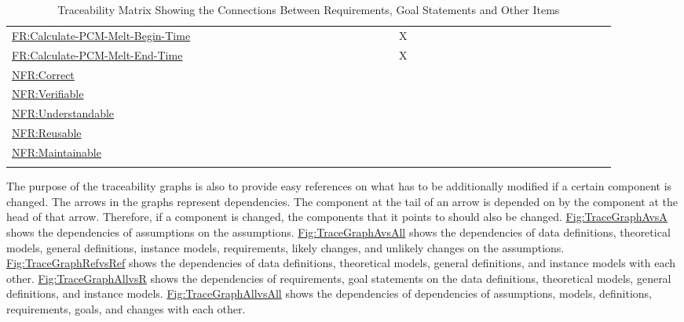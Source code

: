 \documentclass[12pt]{article}
\begin{document}
\begin{longtable}{l l l l l l l l l l l l l l l l l l l l l l l l l l l l l l l l l l l l l l}
\\
\hyperref[calcPCMMeltBegin]{FR:Calculate-PCM-Melt-Begin-Time} &  &  &  &  &  &  &  &  &  &  &  &  &  &  &  &  &  &  & X &  &  &  &  &  &  &  &  &  &  &  &  &  &  &  &  &  & 
\\
\hyperref[calcPCMMeltEnd]{FR:Calculate-PCM-Melt-End-Time} &  &  &  &  &  &  &  &  &  &  &  &  &  &  &  &  &  &  & X &  &  &  &  &  &  &  &  &  &  &  &  &  &  &  &  &  & 
\\
\hyperref[correct]{NFR:Correct} &  &  &  &  &  &  &  &  &  &  &  &  &  &  &  &  &  &  &  &  &  &  &  &  &  &  &  &  &  &  &  &  &  &  &  &  & 
\\
\hyperref[verifiable]{NFR:Verifiable} &  &  &  &  &  &  &  &  &  &  &  &  &  &  &  &  &  &  &  &  &  &  &  &  &  &  &  &  &  &  &  &  &  &  &  &  & 
\\
\hyperref[understandable]{NFR:Understandable} &  &  &  &  &  &  &  &  &  &  &  &  &  &  &  &  &  &  &  &  &  &  &  &  &  &  &  &  &  &  &  &  &  &  &  &  & 
\\
\hyperref[reusable]{NFR:Reusable} &  &  &  &  &  &  &  &  &  &  &  &  &  &  &  &  &  &  &  &  &  &  &  &  &  &  &  &  &  &  &  &  &  &  &  &  & 
\\
\hyperref[maintainable]{NFR:Maintainable} &  &  &  &  &  &  &  &  &  &  &  &  &  &  &  &  &  &  &  &  &  &  &  &  &  &  &  &  &  &  &  &  &  &  &  &  & 
\\
\bottomrule
\caption{Traceability Matrix Showing the Connections Between Requirements, Goal Statements and Other Items}
\label{Table:TraceMatAllvsR}
\end{longtable}
The purpose of the traceability graphs is also to provide easy references on what has to be additionally modified if a certain component is changed. The arrows in the graphs represent dependencies. The component at the tail of an arrow is depended on by the component at the head of that arrow. Therefore, if a component is changed, the components that it points to should also be changed. \hyperref[Figure:TraceGraphAvsA]{Fig:TraceGraphAvsA} shows the dependencies of assumptions on the assumptions. \hyperref[Figure:TraceGraphAvsAll]{Fig:TraceGraphAvsAll} shows the dependencies of data definitions, theoretical models, general definitions, instance models, requirements, likely changes, and unlikely changes on the assumptions. \hyperref[Figure:TraceGraphRefvsRef]{Fig:TraceGraphRefvsRef} shows the dependencies of data definitions, theoretical models, general definitions, and instance models with each other. \hyperref[Figure:TraceGraphAllvsR]{Fig:TraceGraphAllvsR} shows the dependencies of requirements, goal statements on the data definitions, theoretical models, general definitions, and instance models. \hyperref[Figure:TraceGraphAllvsAll]{Fig:TraceGraphAllvsAll} shows the dependencies of dependencies of assumptions, models, definitions, requirements, goals, and changes with each other.
\end{document}
